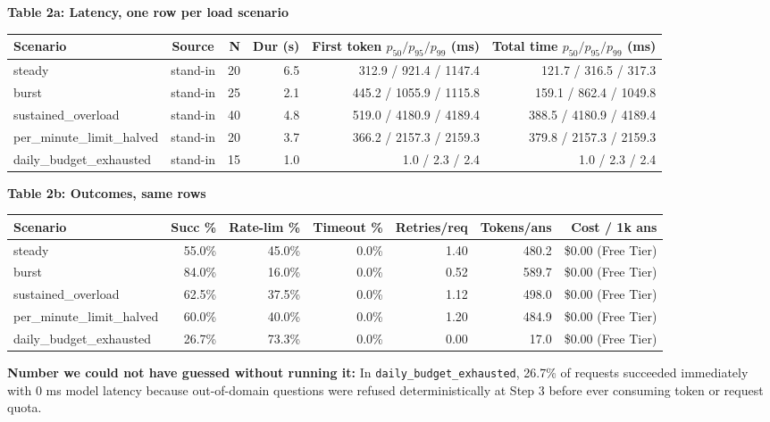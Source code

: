 \documentclass[10pt,a4paper]{article}
\begin{document}
\textbf{Table 2a: Latency, one row per load scenario}
\begin{center}
\footnotesize
\begin{tabularx}{\textwidth}{lcrrrr}
\toprule
\textbf{Scenario} & \textbf{Source} & \textbf{N} & \textbf{Dur (s)} & \textbf{First token $p_{50}/p_{95}/p_{99}$ (ms)} & \textbf{Total time $p_{50}/p_{95}/p_{99}$ (ms)} \\
\midrule
steady & stand-in & 20 & 6.5 & 312.9 / 921.4 / 1147.4 & 121.7 / 316.5 / 317.3 \\
burst & stand-in & 25 & 2.1 & 445.2 / 1055.9 / 1115.8 & 159.1 / 862.4 / 1049.8 \\
sustained\_overload & stand-in & 40 & 4.8 & 519.0 / 4180.9 / 4189.4 & 388.5 / 4180.9 / 4189.4 \\
per\_minute\_limit\_halved & stand-in & 20 & 3.7 & 366.2 / 2157.3 / 2159.3 & 379.8 / 2157.3 / 2159.3 \\
daily\_budget\_exhausted & stand-in & 15 & 1.0 & 1.0 / 2.3 / 2.4 & 1.0 / 2.3 / 2.4 \\
\bottomrule
\end{tabularx}
\end{center}

\textbf{Table 2b: Outcomes, same rows}
\begin{center}
\footnotesize
\begin{tabularx}{\textwidth}{lrrrrrr}
\toprule
\textbf{Scenario} & \textbf{Succ \%} & \textbf{Rate-lim \%} & \textbf{Timeout \%} & \textbf{Retries/req} & \textbf{Tokens/ans} & \textbf{Cost / 1k ans} \\
\midrule
steady & 55.0\% & 45.0\% & 0.0\% & 1.40 & 480.2 & \$0.00 (Free Tier) \\
burst & 84.0\% & 16.0\% & 0.0\% & 0.52 & 589.7 & \$0.00 (Free Tier) \\
sustained\_overload & 62.5\% & 37.5\% & 0.0\% & 1.12 & 498.0 & \$0.00 (Free Tier) \\
per\_minute\_limit\_halved & 60.0\% & 40.0\% & 0.0\% & 1.20 & 484.9 & \$0.00 (Free Tier) \\
daily\_budget\_exhausted & 26.7\% & 73.3\% & 0.0\% & 0.00 & 17.0 & \$0.00 (Free Tier) \\
\bottomrule
\end{tabularx}
\end{center}

\textbf{Number we could not have guessed without running it:} In \texttt{daily\_budget\_exhausted}, 26.7\% of requests succeeded immediately with 0 ms model latency because out-of-domain questions were refused deterministically at Step 3 before ever consuming token or request quota.
\end{document}
